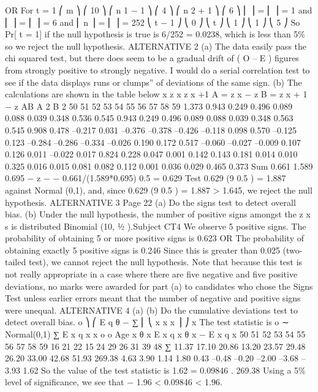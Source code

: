 OR
For t = 1
⎛ m ⎞ ⎛ 10 ⎞
⎛ n 1 − 1 ⎞ ⎛ 4 ⎞
⎛ n 2 + 1 ⎞ ⎛ 6 ⎞
⎜
⎟ = ⎜ ⎟ = 1 and ⎜
⎟ = ⎜ ⎟ = 6 and ⎜ n ⎟ = ⎜ ⎟ = 252
⎝ t − 1 ⎠ ⎝ 0 ⎠
⎝ t ⎠ ⎝ 1 ⎠
⎝ 1 ⎠ ⎝ 5 ⎠
So Pr[ t = 1] if the null hypothesis is true is 6/252 = 0.0238, which is less than
5\% so we reject the null hypothesis.
ALTERNATIVE 2
(a) The data easily pass the chi squared test, but there does seem to be
a gradual drift of ( O – E ) figures from strongly positive to strongly
negative. I would do a serial correlation test to see if the data displays
runs or clumps” of deviations of the same sign.
(b) The calculations are shown in the table below
x z x
z x +1
A = z x − z
B = z x + 1 − z
AB
A 2
B 2
50
51
52
53
54
55
56
57
58
59 1.373
0.943
0.249
0.496
0.089
0.088
0.039
0.348
0.536
0.545
0.943
0.249
0.496
0.089
0.088
0.039
0.348
0.563
0.545
0.908
0.478
–0.217
0.031
–0.376
–0.378
–0.426
–0.118
0.098
0.570
–0.125
0.123
–0.284
–0.286
–0.334
–0.026
0.190
0.172
0.517
–0.060
–0.027
–0.009
0.107
0.126
0.011
–0.022
0.017
0.824
0.228
0.047
0.001
0.142
0.143
0.181
0.014
0.010
0.325
0.016
0.015
0.081
0.082
0.112
0.001
0.036
0.029
0.465
0.373
Sum
0.661
1.589
0.695
−
z
−
−
0.661/(1.589*0.695) 0.5 = 0.629
Test 0.629 (9 0.5 ) = 1.887 against Normal (0,1), and, since
0.629 (9 0.5 ) = 1.887 > 1.645, we reject the null hypothesis.
ALTERNATIVE 3
Page 22
(a) Do the signs test to detect overall bias.
(b) Under the null hypothesis, the number of positive signs
amongst the z x s is distributed Binomial (10, 1⁄2 ).Subject CT4 %
We observe 5 positive signs.
The probability of obtaining 5 or more positive signs is 0.623
OR
The probability of obtaining exactly 5 positive signs is 0.246
Since this is greater than 0.025 (two-tailed test), we cannot reject the
null hypothesis.
Note that because this test is not really appropriate in a case where there are five negative
and five positive deviations, no marks were awarded for part (a) to candidates who chose the
Signs Test unless earlier errors meant that the number of negative and positive signs were
unequal.
ALTERNATIVE 4
(a)
(b)
Do the cumulative deviations test to detect overall bias.
o ⎞
⎛
E
q
θ
−
∑ ⎜ ⎝ x x x ⎟ ⎠
x
The test statistic is
o
∼ Normal(0,1)
∑ E x q x
x
o
o
Age x θ x E x q x θ x − E x q x
50
51
52
53
54
55
56
57
58
59 16
21
22
15
24
29
26
31
39
48
∑ 11.37
17.10
20.86
13.20
23.57
29.48
26.20
33.00
42.68
51.93
269.38 4.63
3.90
1.14
1.80
0.43
–0.48
–0.20
–2.00
–3.68
–3.93
1.62
So the value of the test statistic is
1.62
= 0.09846 .
269.38
Using a 5\% level of significance,
we see that − 1.96 < 0.09846 < 1.96.
